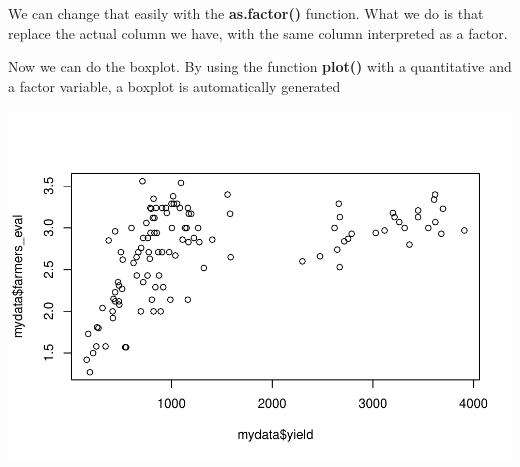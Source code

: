 \documentclass[
]{book}
\newenvironment{Shaded}{\begin{snugshade}}{\end{snugshade}}
\newcommand{\AttributeTok}[1]{\textcolor[rgb]{0.77,0.63,0.00}{#1}}
\newcommand{\FunctionTok}[1]{\textcolor[rgb]{0.00,0.00,0.00}{#1}}
\newcommand{\NormalTok}[1]{#1}
\newcommand{\OtherTok}[1]{\textcolor[rgb]{0.56,0.35,0.01}{#1}}
\newcommand{\SpecialCharTok}[1]{\textcolor[rgb]{0.00,0.00,0.00}{#1}}
\newcommand{\StringTok}[1]{\textcolor[rgb]{0.31,0.60,0.02}{#1}}
\begin{document}
We can change that easily with the \textbf{as.factor() } function. What we do is that replace the actual column we have, with the same column interpreted as a factor.

\begin{Shaded}
\end{Shaded}

Now we can do the boxplot. By using the function \textbf{plot() } with a quantitative and a factor variable, a boxplot is automatically generated

\begin{Shaded}
\end{Shaded}

\includegraphics[width=1.5\linewidth]{PPB-Toolkit-for-R-and-R-Studio_files/figure-latex/unnamed-chunk-57-1}
\end{document}
